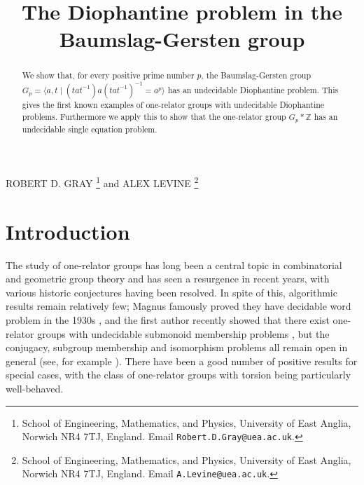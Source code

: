 \documentclass[11pt]{amsart}
\title{The Diophantine problem in the Baumslag-Gersten group}
\theoremstyle{definition}
\numberwithin{theorem}{section}
\begin{document}
\maketitle

\vspace{-4mm}

\begin{center}
 ROBERT D. GRAY
 \footnote{School of Engineering, Mathematics, and Physics, 
University of East Anglia, Norwich NR4 7TJ, England.
 Email \texttt{Robert.D.Gray@uea.ac.uk}.
 }
 and
 ALEX LEVINE
 \footnote{School of Engineering, Mathematics, and Physics, University of 
East Anglia, Norwich NR4 7TJ, England.
 Email \texttt{A.Levine@uea.ac.uk}.
 }
\end{center}

\vspace{-4mm}

\begin{abstract}
We show that, for every positive prime number $p$, the Baumslag-Gersten group $G_p = \langle a, t \mid (tat^{-1}) a(tat^{-1})^{-1} = a^p \rangle$ has an undecidable Diophantine problem. This gives the first known examples of one-relator groups with undecidable Diophantine problems. Furthermore we apply this to show that the one-relator group $G_p \ast \mathbb{Z}$ has an undecidable single equation problem.  
\end{abstract}

\section{Introduction}
The study of one-relator groups has long been a central topic in
	combinatorial and geometric group theory and has seen a resurgence in
	recent years, with various historic conjectures having been resolved. 
In spite of this, algorithmic results remain relatively few; Magnus
	famously proved they have decidable word problem in the 1930s
	\cite{Magnus32}, and the first author recently showed that there exist
	one-relator groups with undecidable submonoid membership problems
	\cite{Gray20}, but the conjugacy, subgroup membership and isomorphism
	problems all remain open in general (see, for example
	\cite{CFMarcoOneRelatorSurvey}). There have been a good number of positive
	results for special cases, with the class of one-relator groups with
	torsion being particularly well-behaved.  
\end{document}
